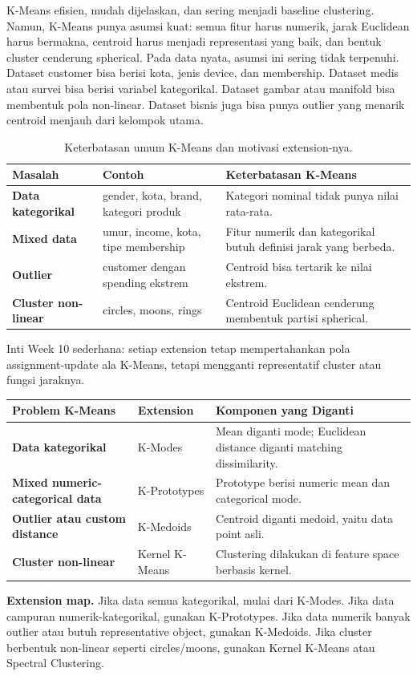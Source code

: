 \documentclass{article}
\newcommand{\infobox}[2]{%
  \par\vspace{0.6em}
  \noindent\colorbox{#1}{%
    \begin{minipage}{0.96\textwidth}
    \vspace{0.65em}
    #2
    \vspace{0.65em}
    \end{minipage}}
  \par\vspace{0.8em}
}
\begin{document}
K-Means efisien, mudah dijelaskan, dan sering menjadi baseline clustering. Namun, K-Means punya asumsi kuat: semua fitur harus numerik, jarak Euclidean harus bermakna, centroid harus menjadi representasi yang baik, dan bentuk cluster cenderung spherical. Pada data nyata, asumsi ini sering tidak terpenuhi. Dataset customer bisa berisi kota, jenis device, dan membership. Dataset medis atau survei bisa berisi variabel kategorikal. Dataset gambar atau manifold bisa membentuk pola non-linear. Dataset bisnis juga bisa punya outlier yang menarik centroid menjauh dari kelompok utama.

\begin{table}[H]
\centering
{}
\begin{tabularx}{\textwidth}{>{\bfseries}lXX}
\rowcolor{tableHead}
Masalah & Contoh & Keterbatasan K-Means \\
\toprule
Data kategorikal & gender, kota, brand, kategori produk & Kategori nominal tidak punya nilai rata-rata. \\
Mixed data & umur, income, kota, tipe membership & Fitur numerik dan kategorikal butuh definisi jarak yang berbeda. \\
Outlier & customer dengan spending ekstrem & Centroid bisa tertarik ke nilai ekstrem. \\
Cluster non-linear & circles, moons, rings & Centroid Euclidean cenderung membentuk partisi spherical. \\
\bottomrule
\end{tabularx}
\caption{Keterbatasan umum K-Means dan motivasi extension-nya.}
\end{table}

Inti Week 10 sederhana: setiap extension tetap mempertahankan pola assignment-update ala K-Means, tetapi mengganti representatif cluster atau fungsi jaraknya.

\begin{table}[H]
\centering
{}
\begin{tabularx}{\textwidth}{>{\bfseries}lXX}
\rowcolor{softOrange}
Problem K-Means & Extension & Komponen yang Diganti \\
\toprule
Data kategorikal & K-Modes & Mean diganti mode; Euclidean distance diganti matching dissimilarity. \\
Mixed numeric-categorical data & K-Prototypes & Prototype berisi numeric mean dan categorical mode. \\
Outlier atau custom distance & K-Medoids & Centroid diganti medoid, yaitu data point asli. \\
Cluster non-linear & Kernel K-Means & Clustering dilakukan di feature space berbasis kernel. \\
\bottomrule
\end{tabularx}
\end{table}
\infobox{softOrange}{\textbf{Extension map.} Jika data semua kategorikal, mulai dari K-Modes. Jika data campuran numerik-kategorikal, gunakan K-Prototypes. Jika data numerik banyak outlier atau butuh representative object, gunakan K-Medoids. Jika cluster berbentuk non-linear seperti circles/moons, gunakan Kernel K-Means atau Spectral Clustering.}
\end{document}
